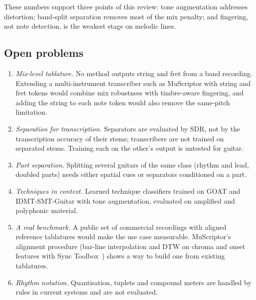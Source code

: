 These numbers support three points of this review: tone augmentation
addresses distortion; band-split separation removes most of the mix penalty;
and fingering, not note detection, is the weakest stage on melodic lines.

\subsection{Open problems}
\begin{enumerate}
\item \emph{Mix-level tablature.} No method outputs string and fret from a
band recording. Extending a multi-instrument transcriber such as MuScriptor
with string and fret tokens would combine mix robustness with timbre-aware
fingering, and adding the string to each note token would also remove the
same-pitch limitation.
\item \emph{Separation for transcription.} Separators are evaluated by SDR,
not by the transcription accuracy of their stems; transcribers are not
trained on separated stems. Training each on the other's output is untested
for guitar.
\item \emph{Part separation.} Splitting several guitars of the same class
(rhythm and lead, doubled parts) needs either spatial cues or separators
conditioned on a part.
\item \emph{Techniques in context.} Learned technique classifiers trained on
GOAT and IDMT-SMT-Guitar with tone augmentation, evaluated on amplified and
polyphonic material.
\item \emph{A real benchmark.} A public set of commercial recordings with
aligned reference tablatures would make the use case measurable. MuScriptor's
alignment procedure (bar-line interpolation and DTW on chroma and onset
features with Sync Toolbox~\cite{muller2021sync}) shows a way to build one
from existing tablatures.
\item \emph{Rhythm notation.} Quantisation, tuplets and compound meters are
handled by rules in current systems and are not evaluated.
\end{enumerate}
